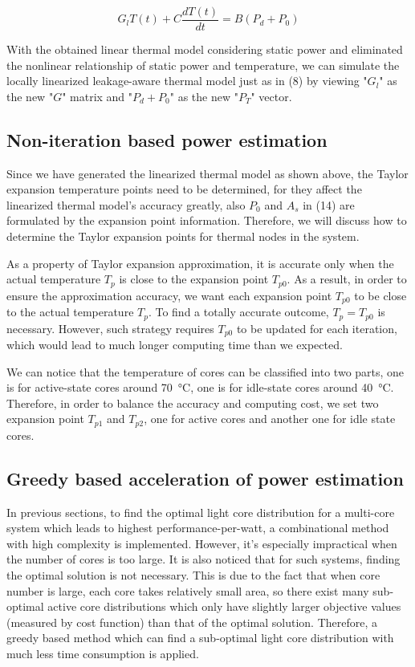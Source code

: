\begin{equation}\label{gt=bp}
G_{l}T(t) + C\frac{dT(t)}{dt} = B(P_{d} + P_{0})
\end{equation}

With the obtained linear thermal model considering static power and eliminated the nonlinear relationship of static power and temperature, we can simulate the locally linearized leakage-aware thermal model just as in (8) by viewing "$G_{l}$" as the new "$G$" matrix and "$P_{d} + P_{0}$" as the new "$P_{T}$" vector.

\subsection{Non-iteration based power estimation}
Since we have generated the linearized thermal model as shown above, the Taylor expansion temperature points need to be determined, for they affect the linearized thermal model's accuracy greatly, also $P_{0}$ and $A_{s}$ in (14) are formulated by the expansion point information. Therefore, we will discuss how to determine the Taylor expansion points for thermal nodes in the system. 

As a property of Taylor expansion approximation, it is accurate only when the actual temperature $T_{p}$ is close to the expansion point $T_{p0}$. As a result, in order to ensure the approximation accuracy, we want each expansion point $T_{p0}$ to be close to the actual temperature $T_{p}$. To find a totally accurate outcome, $T_{p} = T_{p0}$ is necessary. However, such strategy requires $T_{p0}$ to be updated for each iteration, which would lead to much longer computing time than we expected.

We can notice that the temperature of cores can be classified into two parts, one is for active-state cores around \SI{70}{\degreeCelsius}, one is for idle-state cores around \SI{40}{\degreeCelsius}. Therefore, in order to balance the accuracy and computing cost, we set two expansion point $T_{p1}$ and $T_{p2}$, one for active cores and another one for idle state cores.

\subsection{Greedy based acceleration of power estimation}
In previous sections, to find the optimal light core distribution for a multi-core system which leads to highest performance-per-watt, a combinational method with high complexity is implemented. However, it's  especially impractical when the number of cores is too large. It is also noticed that for such systems, finding the optimal solution is not necessary. This is due to the fact that when core number is large, each core takes relatively small area, so there exist many sub-optimal active core distributions which only have slightly larger objective values (measured by cost function) than that of the optimal solution. Therefore, a greedy based method which can find a sub-optimal light core distribution with much less time consumption is applied. 

